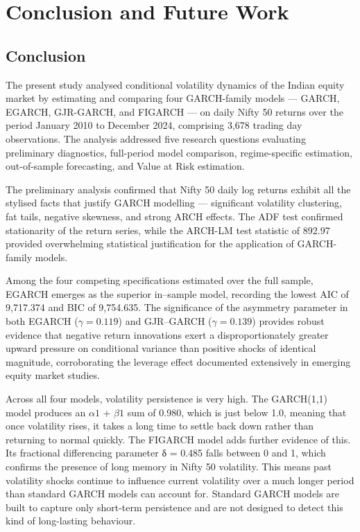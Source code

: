 \chapter{Conclusion and Future Work}

\section{Conclusion}

The present study analysed conditional volatility 
dynamics of the Indian equity market by estimating and comparing four GARCH-family models — GARCH, EGARCH, GJR-GARCH, and FIGARCH — on daily Nifty 50 returns over the period January 2010 to December 2024, comprising 3,678 trading day observations. The analysis addressed five research questions evaluating preliminary diagnostics, full-period model comparison, regime-specific estimation, out-of-sample forecasting, and Value at Risk estimation.


The preliminary analysis confirmed that Nifty 50 daily log returns exhibit all the stylised facts that justify GARCH modelling — significant volatility clustering, fat tails, negative skewness, and strong ARCH effects. The ADF test confirmed stationarity of the return series, while the ARCH-LM test statistic of 892.97 provided overwhelming statistical justification for the application of GARCH-family models.


Among the four competing specifications estimated over 
the full sample, EGARCH emerges as the superior 
in--sample model, recording the lowest AIC of 9,717.374 
and BIC of 9,754.635. The significance of the asymmetry 
parameter in both EGARCH ($\gamma = 0.119$) and 
GJR--GARCH ($\gamma = 0.139$) provides robust evidence 
that negative return innovations exert a 
disproportionately greater upward pressure on conditional 
variance than positive shocks of identical magnitude, 
corroborating the leverage effect documented extensively 
in emerging equity market studies.



Across all four models, volatility persistence is very high. The GARCH(1,1) model produces an $\alpha1$ + $\beta1$ sum of 0.980, which is just below 1.0, meaning that once volatility rises, it takes a long time to settle back down rather than returning to normal quickly.
The FIGARCH model adds further evidence of this. Its fractional differencing parameter δ = 0.485 falls between 0 and 1, which confirms the presence of long memory in Nifty 50 volatility. This means past volatility shocks continue to influence current volatility over a much longer period than standard GARCH models can account for. Standard GARCH models are built to capture only short-term persistence and are not designed to detect this kind of long-lasting behaviour.


